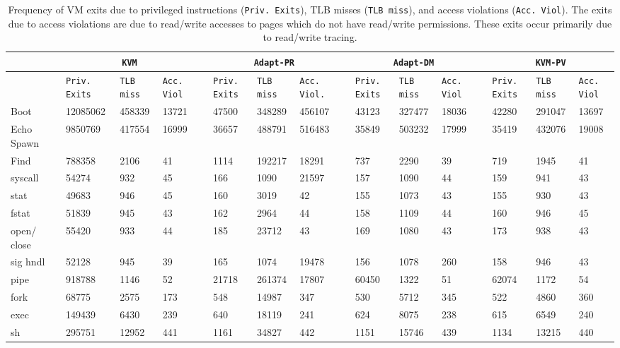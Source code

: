 \documentclass[10pt,twocolumn]{article}
\begin{document}
\begin{center}
\begin{table}
\centering
\begin{tabular}{
  p{1.0cm}@{}|@{ }c@{ }|@{}p{1.3cm}|@{}p{1.0cm}|@{}p{1.0cm}@{}|@{ }c@{ }|@{}p{0.8cm}|@{}p{0.9cm}|@{}p{0.9cm}|@{ }c@{ }|@{}p{0.8cm}|@{}p{0.9cm}|@{}p{0.9cm}|@{ }c@{ }|@{}p{0.8cm}|@{}p{0.9cm}|@{}p{0.9cm}@{}} \hline
	         &  & \multicolumn{3}{c|}{\tt KVM}& & \multicolumn{3}{c|}{\tt Adapt-PR} & & \multicolumn{3}{c|}{\tt Adapt-DM} & & \multicolumn{3}{c}{\tt KVM-PV} \\ \hline

           &&{\tt Priv. Exits}&{\tt TLB miss}&{\tt Acc. Viol} &&{\tt Priv. Exits}&{\tt TLB miss}&{\tt Acc. Viol.}&&{\tt Priv. Exits}&{\tt TLB miss}&{\tt Acc. Viol}&&{\tt Priv. Exits}&{\tt TLB miss}&{\tt Acc. Viol} \\ \hline  
Boot	&&	12085062	&	458339	&	13721	&&	47500	&	348289	&	456107	&&	43123	&	327477	&	18036	&&	42280	&	291047	&	13697	\\	\hline
Echo Spawn	&&	9850769	&	417554	&	16999	&&	36657	&	488791	&	516483	&& 35849	&	503232	&	17999	&&	35419	&	432076	&	19008	\\	\hline
Find	&& 788358	&	2106	&	41	&&	1114	&	192217	&	18291	&&	737	&	2290	&	39	&&	719	&	1945	&	41	\\	\hline
syscall	&&	54274	&	932	&	45	&&	166	&	1090	&	21597	&&	157	&	1090	&	44	&&	159	&	941	&	43	\\	\hline
stat	&&	49683	&	946	&	45	&&	160	&	3019	&	42	&&	155	&	1073	&	43	&&	155	&	930	&	43	\\	\hline
fstat	&&	51839	&	945	&	43	&&	162	&	2964	&	44	&&	158	&	1109	&	44	&&	160	&	946	&	45	\\	\hline
open/ close	&&	55420	&	933	&	44	&&	185	&	23712	&	43	&&	169	&	1080	&	43	&&	173	&	938	&	43	\\	\hline
sig hndl	&&	52128	&	945	&	39	&&	165	&	1074	&	19478	&&	156	&	1078	&	260	&&	158	&	946	&	43	\\	\hline
pipe	&&	918788	&	1146	&	52	&&	21718	&	261374	&	17807	&&	60450	&	1322	&	51	&&	62074	&	1172	&	54	\\	\hline
fork	&&	68775	&	2575	&	173	&&	548	&	14987	&	347	&&	530	&	5712	&	345	&&	522	&	4860	&	360	\\	\hline
exec	&&	149439	&	6430	&	239	&&	640	&	18119	&	241	&&	624	&	8075	&	238	&&	615	&	6549	&	240	\\	\hline
sh	&&	295751	&	12952	&	441	&&	1161	&	34827	&	442	&&	1151	&	15746	&	439	&&	1134	&	13215	&	440	\\	\hline
      \end{tabular}
\label{tab:vm_exit_stats}
\caption{Frequency of VM exits due to privileged instructions ({\tt Priv. Exits}), TLB misses ({\tt TLB miss}), and access violations ({\tt Acc. Viol}). The
exits due to access violations are due to read/write accesses to pages which do not have read/write permissions. These exits occur primarily due to read/write tracing.}
\end{table} 
\end{center}
\end{document}
